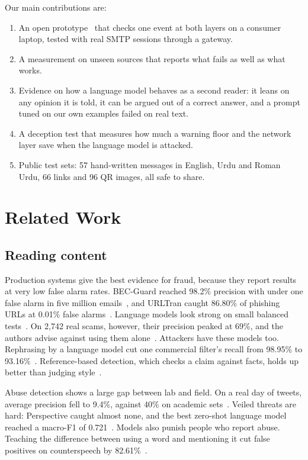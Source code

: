 Our main contributions are:

\begin{enumerate}
  \item An open prototype~\cite{code} that checks one event at both layers on a consumer laptop, tested with real SMTP sessions through a gateway.
  \item A measurement on unseen sources that reports what fails as well as what works.
  \item Evidence on how a language model behaves as a second reader: it leans on any opinion it is told, it can be argued out of a correct answer, and a prompt tuned on our own examples failed on real text.
  \item A deception test that measures how much a warning floor and the network layer save when the language model is attacked.
  \item Public test sets: 57 hand-written messages in English, Urdu and Roman Urdu, 66 links and 96 QR images, all safe to share.
\end{enumerate}

\section{Related Work}

\subsection{Reading content}

Production systems give the best evidence for fraud, because they report results at very low false alarm rates. BEC-Guard reached 98.2\% precision with under one false alarm in five million emails~\cite{becguard}, and URLTran caught 86.80\% of phishing URLs at 0.01\% false alarms~\cite{urltran}. Language models look strong on small balanced tests~\cite{chatspam}. On 2,742 real scams, however, their precision peaked at 69\%, and the authors advise against using them alone~\cite{topcuoglu}. Attackers have these models too. Rephrasing by a language model cut one commercial filter's recall from 98.95\% to 93.16\%~\cite{afane}. Reference-based detection, which checks a claim against facts, holds up better than judging style~\cite{phishllm}.

Abuse detection shows a large gap between lab and field. On a real day of tweets, average precision fell to 9.4\%, against 40\% on academic sets~\cite{hateday}. Veiled threats are hard: Perspective caught almost none, and the best zero-shot language model reached a macro-F1 of 0.721~\cite{threatcore}. Models also punish people who report abuse. Teaching the difference between using a word and mentioning it cut false positives on counterspeech by 82.61\%~\cite{gligoric}.

